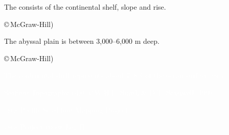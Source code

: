 \documentclass[t]{beamer}
\begin{document}
{
\begin{frame}[b]{The  consists of the continental shelf, slope and rise.}

\hfill \tiny \copyright\,McGraw-Hill)

\end{frame}
}
%
{
\begin{frame}[b]{The abyssal plain is between 3,000–6,000 m deep.}

\hfill \tiny \copyright\,McGraw-Hill)

\end{frame}
}
%
{
\begin{frame}[b]{\textcolor{white}{The continental shelf represents about 7–8\% of the ocean surface area.}}

\hfill \tiny \textcolor{white}{Seafloor Topography \textsc{v}4.0, \copyright\,W.H.F. Smith \& D.T. Sandwell, 1996.}

\end{frame}
}
%
{
\begin{frame}[b]{}
\tiny	\textcolor{white}{\textsc{usgs} Pacific Sea-Floor Mapping Project.}
\end{frame}
}
%

{
\begin{frame}[b]{}

\hfill \tiny \textcolor{white}{\textsc{usgs} Project \textsc{probe} Leg II.}

\end{frame}
}
%
\end{document}

